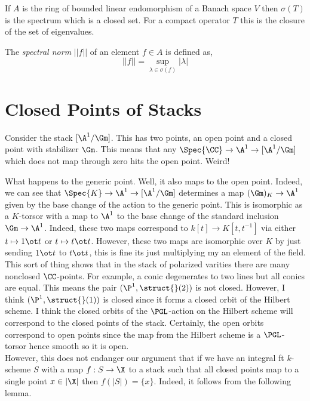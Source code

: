 \documentclass[12pt]{article}
\begin{document}
\begin{example}
If $A$ is the ring of bounded linear endomorphism of a Banach space $V$ then $\sigma(T)$ is the spectrum which is a closed set. For a compact operator $T$ this is the closure of the set of eigenvalues.
\end{example}

\begin{defn}
The \textit{spectral norm} $|| f ||$ of an element $f \in A$ is defined as,
\[ || f || = \sup_{\lambda \in \sigma(f)} | \lambda | \]
\end{defn}

\section{Closed Points of Stacks}

Consider the stack $[\A^1 / \Gm]$. This has two points, an open point and a closed point with stabilizer $\Gm$. This means that any $\Spec{\CC} \to \A^1 \to [\A^1 / \Gm]$ which does not map through zero hits the open point. Weird!

What happens to the generic point. Well, it also maps to the open point. Indeed, we can see that $\Spec{K} \to \A^1 \to [\A^1 / \Gm]$ determines a map $(\Gm)_K \to \A^1$ given by the base change of the action to the generic point. This is isomorphic as a $K$-torsor with a map to $\A^1$ to the base change of the standard inclusion $\Gm \to \A^1$. Indeed, these two maps correspond to $k[t] \to K[t, t^{-1}]$ via either $t \mapsto 1 \ot t$ or $t \mapsto t \ot t$. However, these two maps are isomorphic over $K$ by just sending $1 \ot t$ to $t \ot t$, this is fine its just multiplying my an element of the field.
\bigskip\\
This sort of thing shows that in the stack of polarized varities there are many nonclosed $\CC$-points. For example, a conic degenerates to two lines but all conics are equal. This means the pair $(\P^1, \struct{}(2))$ is not closed. However, I think $(\P^1, \struct{}(1))$ is closed since it forms a closed orbit of the Hilbert scheme. I think the closed orbits of the $\PGL$-action on the Hilbert scheme will correspond to the closed points of the stack. Certainly, the open orbits correspond to open points since the map from the Hilbert scheme is a $\PGL$-torsor hence smooth so it is open. 
\bigskip\\
However, this does not endanger our argument that if we have an integral ft $k$-scheme $S$ with a map $f : S \to \X$ to a stack such that all closed points map to a single point $x \in |\X|$ then $f(|S|) = \{ x \}$. Indeed, it follows from the following lemma.
\end{document}
